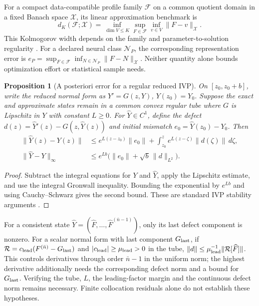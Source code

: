 \documentclass[11pt]{article}
\newtheorem{proposition}[theorem]{Proposition}
\theoremstyle{definition}
\begin{document}
For a compact data-compatible profile family $\mathcal F$ on a common quotient
domain in a fixed Banach space $\mathcal X$, its linear approximation benchmark is
\begin{equation}
 d_K(\mathcal F;\mathcal X)
  =\inf_{\dim V\le K}\sup_{F\in\mathcal F}\inf_{v\in V}\|F-v\|_{\mathcal X}.
 \label{eq:fundamental-width}
\end{equation}
This Kolmogorov width depends on the family and parameter-to-solution
regularity \cite{cohen2015}. For a declared neural class $\mathcal N_P$, the
corresponding representation error is
$e_P=\sup_{F\in\mathcal F}\inf_{N\in\mathcal N_P}\|F-N\|_{\mathcal X}$.
Neither quantity alone bounds optimization effort or statistical sample needs.

\begin{proposition}[A posteriori error for a regular reduced IVP]
\label{prop:ode-error-core}
On $[z_0,z_0+b]$, write the reduced normal form as $Y'=G(z,Y)$,
$Y(z_0)=Y_0$. Suppose the exact and approximate states remain in a common
convex regular tube where $G$ is Lipschitz in $Y$ with constant $L\ge0$.
For $\widehat Y\in C^1$, define the defect
$d(z)=\widehat Y'(z)-G(z,\widehat Y(z))$ and initial mismatch
$e_0=\widehat Y(z_0)-Y_0$. Then
\begin{align}
 \|\widehat Y(z)-Y(z)\|
 &\le e^{L(z-z_0)}\|e_0\|
       +\int_{z_0}^z e^{L(z-\zeta)}\|d(\zeta)\|\,d\zeta,\\
 \|\widehat Y-Y\|_\infty
 &\le e^{Lb}\bigl(\|e_0\|+\sqrt b\,\|d\|_{L^2}\bigr).
 \label{eq:ode-error-core}
\end{align}
\end{proposition}
\begin{proof}
Subtract the integral equations for $Y$ and $\widehat Y$, apply the
Lipschitz estimate, and use the integral Gronwall inequality. Bounding the
exponential by $e^{Lb}$ and using Cauchy--Schwarz gives the second bound.
These are standard IVP stability arguments \cite{teschl2012}.
\end{proof}
For a consistent state $\widehat Y=(\widehat F,\ldots,
\widehat F^{(\bar n-1)})$, only its last defect component is nonzero.
For a scalar normal form with last component $G_{\rm last}$, if
$\mathcal R=c_{\rm lead}(F^{(\bar n)}-G_{\rm last})$ and
$|c_{\rm lead}|\ge\mu_{\rm lead}>0$ in the tube,
$\|d\|\le\mu_{\rm lead}^{-1}\|\mathcal R[\widehat F]\|$.
This controls derivatives through order $\bar n-1$ in the uniform norm;
the highest derivative additionally needs the corresponding defect norm
and a bound for $G_{\rm last}$. Verifying the tube, $L$, the leading-factor margin
and the continuous defect norm remains necessary. Finite collocation
residuals alone do not establish these hypotheses.
\end{document}
